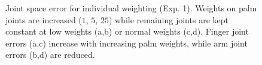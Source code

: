 \begin{figure}[h]
\centering
{}
%

%

\caption{Joint space error for individual weighting (Exp. 1). Weights on palm joints are increased ($1$, $5$, $25$) while remaining joints are kept constant at low weights (a,b) or normal weights (c,d). Finger joint errors (a,c) increase with increasing palm weights, while arm joint errors (b,d) are reduced.}
\label{fig:indiv_joint_error}
\end{figure}

